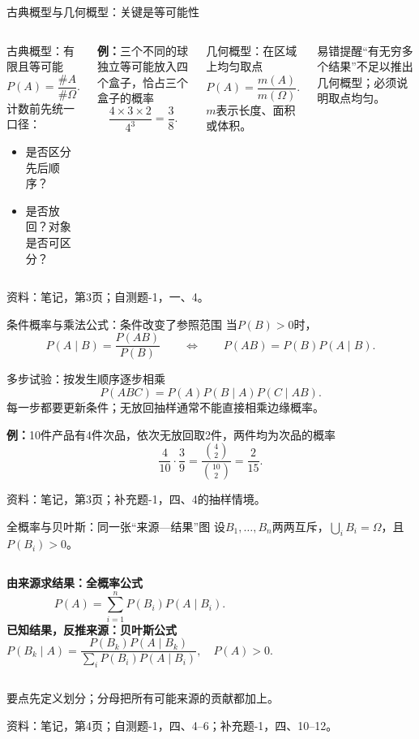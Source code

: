 \documentclass[aspectratio=169,10pt]{beamer}
\newcommand{\source}[1]{\vfill{\color{Muted}\fontsize{6.5}{8}\selectfont 资料：#1\par}}
\newcommand{\key}[1]{\begin{block}{要点}#1\end{block}}
\newcommand{\warn}[1]{\begin{alertblock}{易错提醒}#1\end{alertblock}}
\begin{document}
\begin{frame}[t]{古典概型与几何概型：关键是等可能性}
\begin{columns}[T]
\begin{block}{古典概型：有限且等可能}
\[
P(A)=\frac{\#A}{\#\Omega}.
\]
计数前先统一口径：
\begin{itemize}
\item 是否区分先后顺序？
\item 是否放回？对象是否可区分？
\end{itemize}
\end{block}
\textbf{例：}三个不同的球独立等可能放入四个盒子，恰占三个盒子的概率
\[
\frac{4\times3\times2}{4^3}=\frac38.
\]
\begin{block}{几何概型：在区域上均匀取点}
\[
P(A)=\frac{m(A)}{m(\Omega)}.
\]
$m$表示长度、面积或体积。
\end{block}
\warn{“有无穷多个结果”不足以推出几何概型；必须说明取点均匀。}
\end{columns}
\source{笔记，第3页；自测题-1，一、4。}
\end{frame}

\begin{frame}[t]{条件概率与乘法公式：条件改变了参照范围}
当$P(B)>0$时，
\[
\boxed{P(A\mid B)=\frac{P(AB)}{P(B)}}
\qquad\Longleftrightarrow\qquad
\boxed{P(AB)=P(B)P(A\mid B)}.
\]
\begin{block}{多步试验：按发生顺序逐步相乘}
\[
P(ABC)=P(A)P(B\mid A)P(C\mid AB).
\]
每一步都要更新条件；无放回抽样通常不能直接相乘边缘概率。
\end{block}
\textbf{例：}10件产品有4件次品，依次无放回取2件，两件均为次品的概率
\[
\frac4{10}\cdot\frac3{9}=\frac{\binom42}{\binom{10}2}=\frac2{15}.
\]
\source{笔记，第3页；补充题-1，四、4的抽样情境。}
\end{frame}

\begin{frame}[t]{全概率与贝叶斯：同一张“来源—结果”图}
设$B_1,\ldots,B_n$两两互斥，$\bigcup_iB_i=\Omega$，且$P(B_i)>0$。
\begin{columns}[T]
\textbf{由来源求结果：全概率公式}
\[
P(A)=\sum_{i=1}^nP(B_i)P(A\mid B_i).
\]
\textbf{已知结果，反推来源：贝叶斯公式}
\[
P(B_k\mid A)=\frac{P(B_k)P(A\mid B_k)}{\sum_iP(B_i)P(A\mid B_i)},\quad P(A)>0.
\]
\end{columns}
\key{先定义划分；分母把所有可能来源的贡献都加上。}
\source{笔记，第4页；自测题-1，四、4--6；补充题-1，四、10--12。}
\end{frame}
\end{document}
